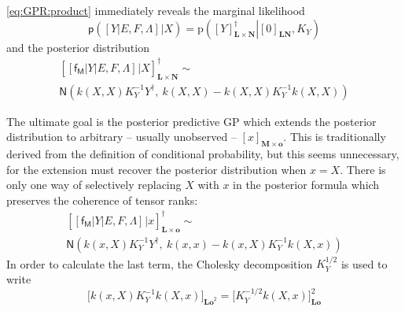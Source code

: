 \documentclass[preprint,12pt]{elsarticle}
\newcommand*{\M}[1]{\ensuremath{#1}\xspace}
\newcommand*{\x}{\times}
\newcommand*{\mi}[1]{\mathbf{#1}}
\newcommand*{\rv}[1]{\mathsf{#1}}
\newcommand*{\te}[2][]{\left\lbrack{#2}\right\rbrack_{#1}}
\newcommand*{\tte}[2][]{\lbrack{#2}\rbrack_{#1}}
\newcommand*{\prob}[3]{\M{\mathrm{p}\!\left(\left.{#1}\right\vert{#2,#3}\right)}}
\newcommand*{\gauss}[2]{\mathsf{N}\!\left({#1,#2}\right)}
\begin{document}
        \cref{eq:GPR:product} immediately reveals the marginal likelihood
        \begin{equation} \label{eq:GPR:marginalLikelihood}
            \mathsf{p}\!\left(\te{Y \vert E,F,\Lambda} \big\vert X\right)
            = \prob{\te[\mi{L\x N}]{Y}^{\dagger}}{\te[\mi{LN}]{0}}{K_Y}
        \end{equation}
        and the posterior distribution
        \begin{multline*}
            \te[\mi{L\x N}]{\te{\rv{f_M} \vert Y \vert E,F,\Lambda} \big\vert X}^{\dagger} \sim \\
            \gauss{k(X,X) K_{Y}^{-1} Y^{\dagger}}{\ k(X,X) - k(X,X) K_{Y}^{-1} k(X,X)}
        \end{multline*}

        The ultimate goal is the posterior predictive GP which extends the posterior distribution to arbitrary -- usually unobserved -- $\te[\mi{M}\x\mi{o}]{x}$. This is traditionally derived from the definition of conditional probability, but this seems unnecessary, for the extension must recover the posterior distribution when $x=X$. There is only one way of selectively replacing $X$ with $x$ in the posterior formula which preserves the coherence of tensor ranks:
        \begin{multline} \label{def:GPR:Predictive}
            \te[\mi{L\x o}]{\te{\rv{f_M} \vert Y \vert E,F,\Lambda} \big\vert x}^{\dagger} \sim \\
            \gauss{k(x,X) K_{Y}^{-1} Y^{\dagger}}{\ k(x,x) - k(x,X) K_{Y}^{-1} k(X,x)}
        \end{multline}
        In order to calculate the last term, the Cholesky decomposition $K_{Y}^{1/2}$ is used to write
        \begin{equation*}
            \tte[\mi{Lo}^{2}]{k(x,X) K_{Y}^{-1} k(X,x)} = \tte[\mi{Lo}]{K_{Y}^{-1/2} k(X,x)}^{2}
        \end{equation*}
\end{document}
